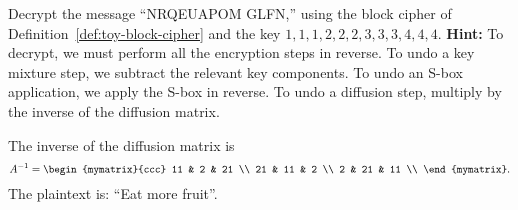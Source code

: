 \begin{enumialphparenastyle}
\begin{ex}
  Decrypt the message ``NRQEUAPOM GLFN,'' using the block cipher of
  Definition~\ref{def:toy-block-cipher} and the key
  $1,1,1,2,2,2,3,3,3,4,4,4$. \textbf{Hint:} To decrypt, we must
  perform all the encryption steps in reverse. To undo a key mixture
  step, we subtract the relevant key components. To undo an S-box
  application, we apply the S-box in reverse. To undo a diffusion
  step, multiply by the inverse of the diffusion matrix.
  \begin{sol}
    The inverse of the diffusion matrix is
    \begin{equation*}
      A^{-1} = \begin{mymatrix}{ccc}
        11 & 2 & 21 \\
        21 & 11 & 2 \\
        2 & 21 & 11 \\
      \end{mymatrix}.
    \end{equation*}
    The plaintext is: ``Eat more fruit''.
  \end{sol}
\end{ex}

\end{enumialphparenastyle}
